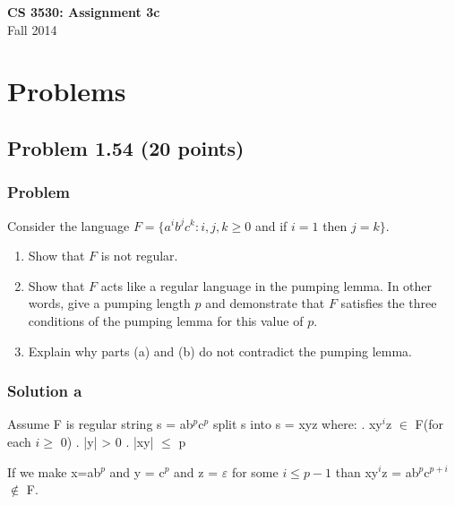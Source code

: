 \documentclass{article}
\begin{document}
\begin{empfile}

\begin{center}
\textbf{\Large CS 3530: Assignment 3c} \\[2mm]
Fall 2014
\end{center}

\raggedright

\section*{Problems}

\subsection*{Problem 1.54 (20 points)}

\subsubsection*{Problem}

Consider the language $F=\{a^i b^j c^k: i,j,k \geq 0$ and if $i=1$ then $j=k\}$.

\begin{enumerate}[\bfseries a.]
\item Show that $F$ is not regular.
\item Show that $F$ acts like a regular language in the pumping
lemma. In other words, give a pumping length $p$ and demonstrate
that $F$ satisfies the three conditions of the pumping lemma for
this value of $p$.
\item Explain why parts (a) and (b) do not contradict the pumping
lemma.
\end{enumerate}

\subsubsection*{Solution a}
Assume F is regular \newline
string s = ab$^p$c$^p$ \newline
split s into s = xyz where: . xy$^i$z $\in$ F(for each $i \ge$ 0) . |y| > 0 . |xy| $\le$ p \newline

If we make x=ab$^p$ and y = c$^p$ and z = $\varepsilon$ for some 
$i \le p - 1$ than xy$^i$z = ab$^p$c$^{p+i}$ $\notin$ F.




\end{empfile}
\end{document}
